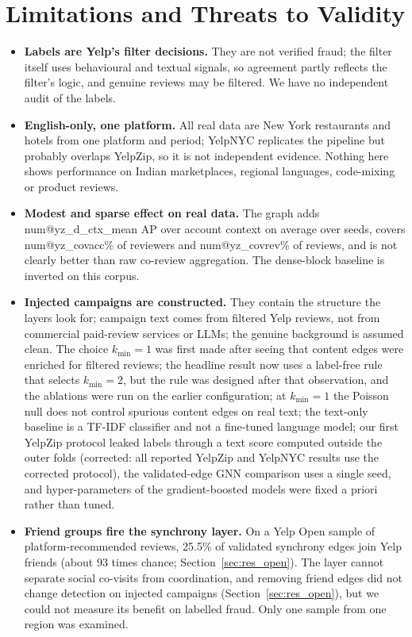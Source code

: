 \documentclass[pdflatex,sn-basic]{sn-jnl}
\makeatletter
\theoremstyle{thmstyleone}
\theoremstyle{thmstylethree}
\newcommand{\num}[1]{\csname num@#1\endcsname}
\makeatother
\begin{document}
\section{Limitations and Threats to Validity}\label{sec:limits}
\begin{itemize}
\item \textbf{Labels are Yelp's filter decisions.} They are not verified fraud; the filter itself uses behavioural and textual signals, so agreement partly reflects the filter's logic, and genuine reviews may be filtered. We have no independent audit of the labels.
\item \textbf{English-only, one platform.} All real data are New York restaurants and hotels from one platform and period; YelpNYC replicates the pipeline but probably overlaps YelpZip, so it is not independent evidence. Nothing here shows performance on Indian marketplaces, regional languages, code-mixing or product reviews.
\item \textbf{Modest and sparse effect on real data.} The graph adds \num{yz_d_ctx_mean} AP over account context on average over seeds, covers \num{yz_covacc}\% of reviewers and \num{yz_covrev}\% of reviews, and is not clearly better than raw co-review aggregation. The dense-block baseline is inverted on this corpus.
\item \textbf{Injected campaigns are constructed.} They contain the structure the layers look for; campaign text comes from filtered Yelp reviews, not from commercial paid-review services or LLMs; the genuine background is assumed clean. The choice $k_{\min}=1$ was first made after seeing that content edges were enriched for filtered reviews; the headline result now uses a label-free rule that selects $k_{\min}=2$, but the rule was designed after that observation, and the ablations were run on the earlier configuration; at $k_{\min}=1$ the Poisson null does not control spurious content edges on real text; the text-only baseline is a TF-IDF classifier and not a fine-tuned language model; our first YelpZip protocol leaked labels through a text score computed outside the outer folds (corrected: all reported YelpZip and YelpNYC results use the corrected protocol), the validated-edge GNN comparison uses a single seed, and hyper-parameters of the gradient-boosted models were fixed a priori rather than tuned.
\item \textbf{Friend groups fire the synchrony layer.} On a Yelp Open sample of platform-recommended reviews, 25.5\% of validated synchrony edges join Yelp friends (about 93 times chance; Section~\ref{sec:res_open}). The layer cannot separate social co-visits from coordination, and removing friend edges did not change detection on injected campaigns (Section~\ref{sec:res_open}), but we could not measure its benefit on labelled fraud. Only one sample from one region was examined.

\end{itemize}
\end{document}
